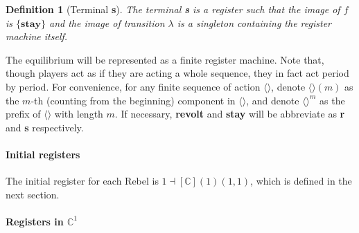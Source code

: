 \documentclass[12pt,letter]{article}
\newcommand{\Kappa}{\mathbb{C}}
\newtheorem{definition}{Definition}[section]
\theoremstyle{definition}
\theoremstyle{definition}
\theoremstyle{remark}
\theoremstyle{claim}
\begin{document}
\begin{definition}[Terminal \textbf{s}]
The terminal \textbf{s} is a register such that the image of $f$ is $\{\textbf{stay}\}$ and the image of transition $\lambda$ is a singleton containing the register machine itself. 
\end{definition}

The equilibrium will be represented as a {finite register machine}. Note that, though players act as if they are acting a whole sequence, they in fact act period by period. For convenience, for any finite sequence of action $\langle \rangle$, denote $\langle \rangle(m)$ as the $m$-th (counting from the beginning) component in $\langle \rangle$, and denote $\langle \rangle^m$ as the prefix of $\langle \rangle$ with length $m$. If necessary, \textbf{revolt} and \textbf{stay} will be abbreviate as \textbf{r} and \textbf{s} respectively. 

\paragraph{Initial registers}
The initial register for each Rebel is $1\dashv[\Kappa](1)(1,1)$, which is defined in the next section.
\paragraph{Registers in $\Kappa^1$}
\end{document}
